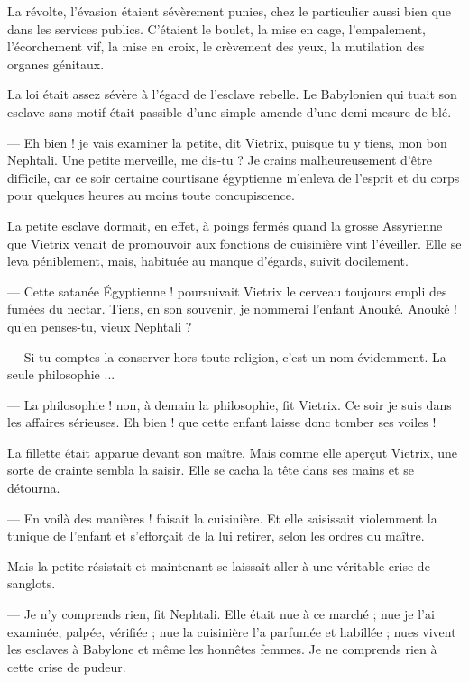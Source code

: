 \documentclass[a4paper, 11pt, oneside, polutonikogreek, french]{article}
\begin{document}
La révolte, l'évasion étaient sévèrement punies, chez le particulier aussi bien que dans les services publics. C'étaient le boulet, la mise en cage, l'empalement, l'écorchement vif, la mise en croix, le crèvement des yeux, la mutilation des organes génitaux.

La loi était assez sévère à l'égard de l'esclave rebelle. Le Babylonien qui tuait son esclave sans motif était passible d'une simple amende d'une demi-mesure de blé.

\bigskip
\centerline{\EightStarTaper}
\centerline{\EightStarTaper\EightStarTaper}
\bigskip

--- Eh bien ! je vais examiner la petite, dit Vietrix, puisque tu y tiens, mon bon Nephtali. Une petite merveille, me dis-tu ? Je crains malheureusement d'être difficile, car ce soir certaine courtisane égyptienne m'enleva de l'esprit et du corps pour quelques heures au moins toute concupiscence.

La petite esclave dormait, en effet, à poings fermés quand la grosse Assyrienne que Vietrix venait de promouvoir aux fonctions de cuisinière vint l'éveiller. Elle se leva péniblement, mais, habituée au manque d'égards, suivit docilement.

--- Cette satanée Égyptienne ! poursuivait Vietrix le cerveau toujours empli des fumées du nectar. Tiens, en son souvenir, je nommerai l'enfant Anouké. Anouké ! qu'en penses-tu, vieux Nephtali ?

--- Si tu comptes la conserver hors toute religion, c'est un nom évidemment. La seule philosophie ...

--- La philosophie ! non, à demain la philosophie, fit Vietrix. Ce soir je suis dans les affaires sérieuses. Eh bien ! que cette enfant laisse donc tomber ses voiles !

La fillette était apparue devant son maître. Mais comme elle aperçut Vietrix, une sorte de crainte sembla la saisir. Elle se cacha la tête dans ses mains et se détourna.

--- En voilà des manières ! faisait la cuisinière. Et elle saisissait violemment la tunique de l'enfant et s'efforçait de la lui retirer, selon les ordres du maître.

Mais la petite résistait et maintenant se laissait aller à une véritable crise de sanglots.

--- Je n'y comprends rien, fit Nephtali. Elle était nue à ce marché ; nue je l'ai examinée, palpée, vérifiée ; nue la cuisinière l'a parfumée et habillée ; nues vivent les esclaves à Babylone et même les honnêtes femmes. Je ne comprends rien à cette crise de pudeur.
\end{document}
